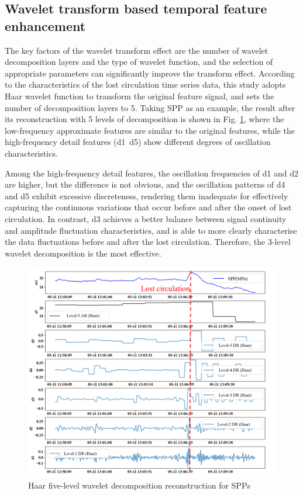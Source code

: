 \documentclass[journal,article,submit,pdftex,moreauthors]{Definitions/mdpi}
\begin{document}
\subsection{Wavelet transform based temporal feature enhancement}

The key factors of the wavelet transform effect are the number of wavelet decomposition layers and the type of wavelet function, and the selection of appropriate parameters can significantly improve the transform effect. According to the characteristics of the lost circulation time series data, this study adopts Haar wavelet function to transform the original feature signal, and sets the number of decomposition layers to 5. Taking SPP as an example, the result after its reconstruction with 5 levels of decomposition is shown in Fig.  \ref{fig:Haar five-level wavelet decomposition reconstruction for SPPs}, where the low-frequency approximate features are similar to the original features, while the high-frequency detail features (d1~d5) show different degrees of oscillation characteristics.

Among the high-frequency detail features, the oscillation frequencies of d1 and d2 are higher, but the difference is not obvious, and the oscillation patterns of d4 and d5 exhibit excessive discreteness, rendering them inadequate for effectively capturing the continuous variations that occur before and after the onset of lost circulation. In contrast, d3 achieves a better balance between signal continuity and amplitude fluctuation characteristics, and is able to more clearly characterise the data fluctuations before and after the lost circulation. Therefore, the 3-level wavelet decomposition is the most effective.

\begin{figure}[h]
    \centering
    \includegraphics[width=0.75\linewidth]{图片/5级小波分解.png}
    \caption{Haar five-level wavelet decomposition reconstruction for SPPs}
    \label{fig:Haar five-level wavelet decomposition reconstruction for SPPs}
\end{figure}
\end{document}
